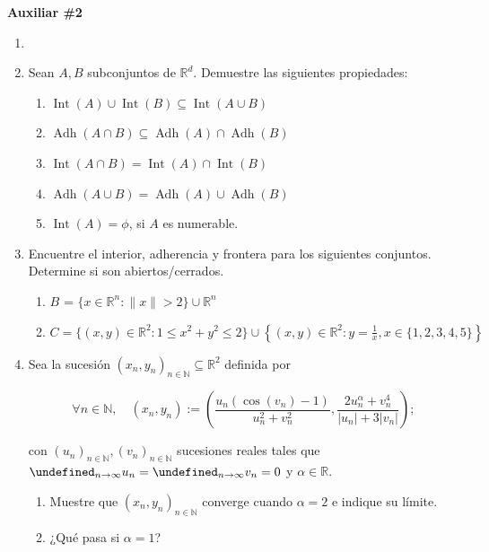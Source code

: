 \documentclass[letterpaper,11pt]{article}
\DeclareMathOperator{\inte}{Int}
\DeclareMathOperator{\adh}{Adh}
\let\lim=\undefined\DeclareMathOperator*{\lim}{\text{lím}}
\newcommand{\R}{\mathbb{R}}
\newcommand{\norm}[1]{\lVert #1\rVert }
\begin{document}
\begin{center}
	\LARGE \bf{Auxiliar \#2}\\
\end{center}

\vspace{-1cm}
\begin{enumerate}\setlength{\itemsep}{0.4cm}	
\item[]


\item Sean $A, B$ subconjuntos de $\R^d$. Demuestre las siguientes propiedades:
\begin{enumerate}
    \item $\inte(A)\cup\inte(B) \subseteq \inte(A\cup B)$
    \item $\adh(A\cap B) \subseteq \adh(A)\cap\adh(B)$
    \item $\inte(A\cap B)=\inte(A)\cap \inte(B)$ 
    \item $\adh(A\cup B)=\adh(A)\cup\adh(B)$
    \item $\inte(A)=\phi$, si $A$ es numerable.
    
\end{enumerate}

\item Encuentre el interior, adherencia y frontera para los siguientes conjuntos. Determine si son abiertos/cerrados.

\begin{enumerate}
    \item $B$ = $\{  x\in \R^{n} : \norm{x}  > 2     \} \cup \R^n   $
    
    \item $ C =\{(x,y)\in\R^2:1\leq x^2 + y^2 \leq 2\}\cup\left\{ (x,y) \in \R^2: y=\frac{1}{x},x\in\{1,2,3,4,5\}\right\}$
\end{enumerate}

\item Sea la sucesión $(x_n, y_n)_{n\in \mathbb{N}} \subseteq \mathbb{R}^2$ definida por

$$\forall n \in \mathbb{N}, \quad (x_n, y_n) := \left( \frac{u_n(\cos(v_n)-1)}{u_n^2 + v_n^2}, \frac{2u_n^\alpha + v_n^4}{|u_n|+3|v_n|} \right);$$

con $(u_n)_{n\in \mathbb{N}}, (v_n)_{n\in \mathbb{N}}$ sucesiones reales tales que $\lim_{n \to \infty} u_n = \lim_{n \to \infty} v_n = 0$ y $\alpha \in \mathbb{R}$.
    
    
    \begin{enumerate}
    \item Muestre que $(x_n,y_n)_{n\in \mathbb{N}}$ converge cuando $\alpha = 2$ e indique su límite.
    \item ¿Qué pasa si $\alpha =1$?
    \end{enumerate}

\end{enumerate}	
\end{document}
